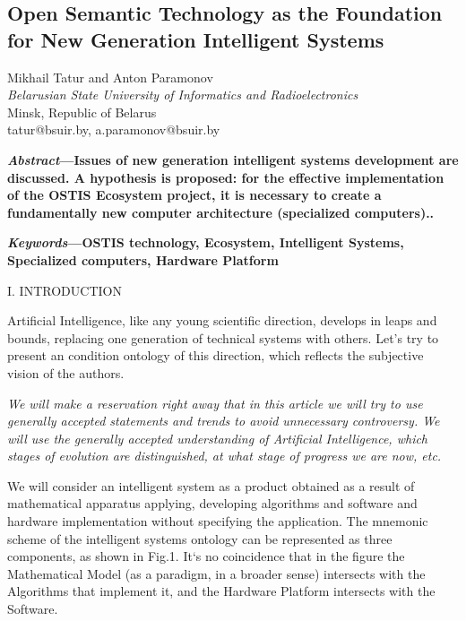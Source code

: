 \documentclass[10pt]{article}
\begin{document}
{\clearpage
\begin{center}
    \section*{\Huge Open Semantic Technology as the Foundation
for New Generation Intelligent Systems}
\vspace{13pt}
Mikhail Tatur and Anton Paramonov\\
\textit{Belarusian State University of Informatics and Radioelectronics}\\
Minsk, Republic of Belarus\\
tatur@bsuir.by, a.paramonov@bsuir.by
\vspace{12pt}
\end{center}

\begin{multicols*}{2}
\textbf{\textit{Abstract}—Issues of new generation intelligent 
systems development are discussed. A hypothesis is proposed: for 
the effective implementation of the OSTIS Ecosystem project,
it is necessary to create a fundamentally new computer
architecture (specialized computers)..}

\textbf{\textit{Keywords}—OSTIS technology, Ecosystem, Intelligent
Systems, Specialized computers, Hardware Platform}
\vspace{10pt}
\begin{center}
  {\large I. I}NTRODUCTION  
\end{center}

Artificial Intelligence, like any young scientific direction, develops in leaps and bounds, replacing one
generation of technical systems with others. Let’s try to
present an condition ontology of this direction, which
reflects the subjective vision of the authors.

\textit{We will make a reservation right away that in this
article we will try to use generally accepted statements
and trends to avoid unnecessary controversy. We will
use the generally accepted understanding of Artificial
Intelligence, which stages of evolution are distinguished,
at what stage of progress we are now, etc.}

We will consider an intelligent system as a product
obtained as a result of mathematical apparatus applying, developing algorithms and software and hardware
implementation without specifying the application. The
mnemonic scheme of the intelligent systems ontology
can be represented as three components, as shown in
Fig.1. It‘s no coincidence that in the figure the Mathematical Model (as a paradigm, in a broader sense) intersects
with the Algorithms that implement it, and the Hardware
Platform intersects with the Software.


\end{multicols*}}
\end{document}
